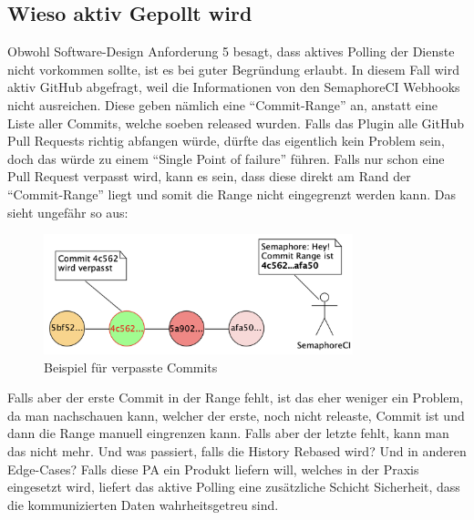 \subsection{Wieso aktiv Gepollt wird}
\label{sec:why_active_polling}
Obwohl Software-Design Anforderung 5 besagt, dass aktives Polling der Dienste nicht vorkommen sollte, ist
es bei guter Begründung erlaubt. In diesem Fall wird aktiv GitHub abgefragt, weil die Informationen von
den SemaphoreCI Webhooks nicht ausreichen. Diese geben nämlich eine \enquote{Commit-Range} an, anstatt
eine Liste aller Commits, welche soeben released wurden. \newline
Falls das Plugin alle GitHub Pull Requests richtig abfangen würde, dürfte das eigentlich kein Problem sein,
doch das würde zu einem \enquote{Single Point of failure} führen. Falls nur schon eine Pull Request verpasst
wird, kann es sein, dass diese direkt am Rand der \enquote{Commit-Range} liegt und somit die Range nicht
eingegrenzt werden kann. Das sieht ungefähr so aus:
\begin{figure}[H]
  \centering
  \includegraphics[width=0.8\textwidth]{images/misc/missed_commit_range.png}
  \caption[UMLet Diagramm eines Beispiels für verpasste Commits]{Beispiel für verpasste Commits}
  \label{fig:commit_range}
\end{figure}
Falls aber der erste Commit in der Range fehlt, ist das eher weniger ein Problem, da man nachschauen
kann, welcher der erste, noch nicht releaste, Commit ist und dann die Range manuell eingrenzen kann. \newline
Falls aber der letzte fehlt, kann man das nicht mehr. Und was passiert, falls die History Rebased wird?
Und in anderen Edge-Cases? Falls diese PA ein Produkt liefern will, welches in der Praxis eingesetzt wird,
liefert das aktive Polling eine zusätzliche Schicht Sicherheit, dass die kommunizierten Daten wahrheitsgetreu
sind.

